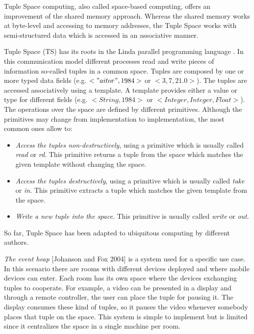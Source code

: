 

Tuple Space computing, also called space-based computing, offers an improvement of the shared memory approach.
Whereas the shared memory works at byte-level and accessing to memory addresses,
the Tuple Space works with semi-structured data which is accessed in an associative manner.

Tuple Space (TS) has its roots in the Linda parallel programming language \cite{gelernter_generative_1985}.
In this communication model different processes read and write pieces of information so-called tuples in a common space.
Tuples are composed by one or more typed data fields (e.g. $<"aitor",1984>$ or $<3,7,21.0>$).
The tuples are accessed associatively using a template.
A template provides either a value or type for different fields (e.g. $<String,1984>$ or $<Integer, Integer, Float>$).
The operations over the space are defined by different primitives.
Although the primitives may change from implementation to implementation, the most common ones allow to:

\begin{itemize}
  \item \emph{Access the tuples non-destructively}, using a primitive which is usually called \emph{read} or \emph{rd}.
	This primitive returns a tuple from the space which matches the given template without changing the space.
  \item \emph{Access the tuples destructively}, using a primitive which is usually called \emph{take} or \emph{in}.
	This primitive extracts a tuple which matches the given template from the space.
  \item \emph{Write a new tuple into the space}. This primitive is usually called \emph{write} or \emph{out}.
\end{itemize}

So far, Tuple Space has been adapted to ubiquitous computing by different authors.

\emph{The event heap} [Johanson and Fox 2004] is a system used for a specific use case. %
In this scenario there are rooms with different devices deployed and where mobile devices can enter.
Each room has its own space where the devices exchanging tuples to cooperate.
For example, a video can be presented in a display and through a remote controller, the user can place the tuple for pausing it.
The display consumes these kind of tuples, so it pauses the video whenever somebody places that tuple on the space.
This system is simple to implement but is limited since it centralizes the space in a single machine per room. %


